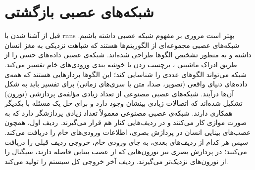  \section{شبکه‌های عصبی بازگشتی}
 قبل از آشنا شدن با \glspl{rnn} بهتر است مروری بر مفهوم شبکه عصبی داشته باشیم. شبکه‌های عصبی مجموعه‌ای از الگوریتم‌ها هستند که شباهت نزدیکی به مغز انسان داشته و به منظور تشخیص الگوها طراحی شده‌اند. شبکه‌ی عصبی داده‌های حسی را از طریق ادراک ماشینی ، برچسب زدن یا خوشه بندی ورودی‌های خام تفسیر می‌کند. شبکه می‌تواند الگوهای عددی را شناسایی ‌کند؛ این الگوها بردارهایی هستند که همه‌ی داده‌های دنیای واقعی (تصویر، صدا، متن یا سری‌های زمانی) برای تفسیر باید به شکل آن‌ها درآیند. شبکه‌های عصبی مصنوعی از تعداد زیادی مؤلفه‌ی پردازشی (نورون) تشکیل شده‌اند که اتصالات زیادی بینشان وجود دارد و برای حل یک مسئله با یکدیگر همکاری دارند.
 شبکه‌ی عصبی مصنوعی معمولاً تعداد زیادی پردازشگر دارد که به صورت موازی کار می‌کنند و در ردیف‌هایی کنار هم قرار می‌گیرند. ردیف اول، همچون عصب‌های بینایی انسان در پردازش بصری، اطلاعات ورودی‌های خام را دریافت می‌کند. سپس هر کدام از ردیف‌های بعدی، به جای ورودی خام، خروجی ردیف قبلی را دریافت می‌کنند؛ در پردازش بصری نیز نورون‌هایی که از عصب بینایی فاصله دارند، سیگنال را از نورون‌های نزدیک‌تر می‌گیرند. ردیف آخر خروجی کل سیستم را تولید می‌کند.

